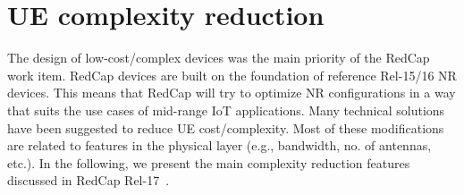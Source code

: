 \documentclass[]{IEEEtran}
\begin{document}
\section{UE complexity reduction}
\label{sec:4-complexity-reduction}



The design of low-cost/complex devices was the main priority of the RedCap work item.
RedCap devices are built on the foundation of reference Rel-15/16 NR devices.
This means that RedCap will try to optimize NR configurations in a way that suits the use cases of mid-range IoT applications.
Many technical solutions have been suggested to reduce UE cost/complexity.
Most of these modifications are related to features in the physical layer (e.g., bandwidth, no. of antennas, etc.).
In the following, we present the main complexity reduction features discussed in RedCap Rel-17~\cite{3gpp_study_2021_38.875}.
\end{document}
